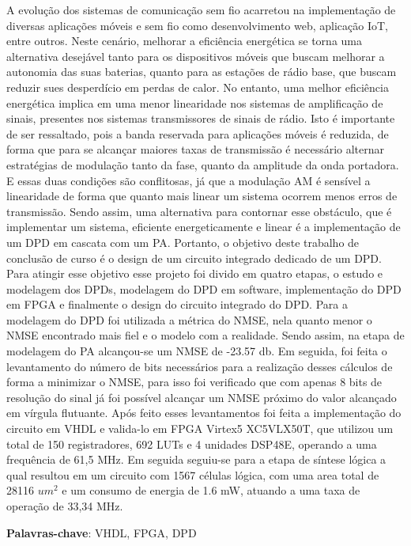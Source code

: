 A evolução dos sistemas de comunicação sem fio acarretou na implementação de diversas aplicações móveis e sem fio como desenvolvimento web, aplicação IoT, entre outros. Neste cenário, melhorar a eficiência energética se torna uma alternativa desejável tanto para os dispositivos móveis que buscam melhorar a autonomia das suas baterias, quanto para as estações de rádio base, que buscam reduzir sues desperdício em perdas de calor. No entanto, uma melhor eficiência energética implica em uma menor linearidade nos sistemas de amplificação de sinais, presentes nos sistemas transmissores de sinais de rádio. Isto é importante de ser ressaltado, pois a banda reservada para aplicações móveis é reduzida, de forma que para se alcançar maiores taxas de transmissão é necessário alternar estratégias de modulação tanto da fase, quanto da amplitude da onda portadora. E essas duas condições são conflitosas, já que a modulação AM é sensível a linearidade de forma que quanto mais linear um sistema ocorrem menos erros de transmissão. Sendo assim, uma alternativa para contornar esse obstáculo, que é implementar um sistema, eficiente energeticamente e linear é a implementação de um DPD em cascata com um PA. Portanto, o objetivo deste trabalho de conclusão de curso é o design de um circuito integrado dedicado de um DPD. Para atingir esse objetivo esse projeto foi divido em quatro etapas, o estudo e modelagem dos DPDs, modelagem do DPD em software, implementação do DPD em FPGA e finalmente o design do circuito integrado do DPD. Para a modelagem do DPD foi utilizada a métrica do NMSE, nela quanto menor o NMSE encontrado mais fiel e o modelo com a realidade. Sendo assim, na etapa de modelagem do PA alcançou-se um NMSE de -23.57 db. Em seguida, foi feita o levantamento do número de bits necessários para a realização desses cálculos de forma a minimizar o NMSE, para isso foi verificado que com apenas 8 bits de resolução do sinal já foi possível alcançar um NMSE próximo do valor alcançado em vírgula flutuante. Após feito esses levantamentos foi feita a implementação do circuito em VHDL e  valida-lo em FPGA Virtex5 XC5VLX50T, que utilizou um total de 150 registradores, 692 LUTs e 4 unidades DSP48E, operando a uma frequência de 61,5 MHz. Em seguida seguiu-se para a etapa de síntese lógica a qual resultou em um circuito com 1567 células lógica, com uma area total de 28116 $um^2$ e um consumo de energia de 1.6 mW, atuando a uma taxa de operação de 33,34 MHz.

\textbf{Palavras-chave}: VHDL, FPGA, DPD 
